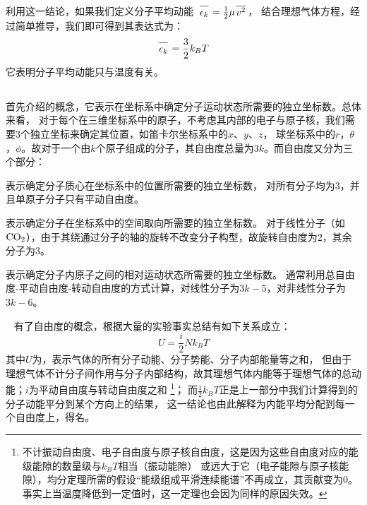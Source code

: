             利用这一结论，如果我们定义分子平均动能\ $\upperline{\epsilon_{k}} = \frac{1}{2} \mu \upperline{v^{2}}$，
            结合理想气体方程，经过简单推导，我们即可得到其表达式为：
            \begin{equation}
                \upperline{\epsilon_{k}} = \frac{3}{2}k_{B}T
                \nonumber
            \end{equation}
            它表明分子平均动能只与温度有关。
        \subsection[能量均分原理]{}
            首先介绍的概念，它表示在坐标系中确定分子运动状态所需要的独立坐标数。总体来看，
            对于每个在三维坐标系中的原子，不考虑其内部的电子与原子核，我们需要3个独立坐标来确定其位置，如笛卡尔坐标系中的$x$、$y$、$z$，
            球坐标系中的$r$，$\theta$，$\phi$。故对于一个由$k$个原子组成的分子，其自由度总量为$3k$。而自由度又分为三个部分：
            \begin{Itemize}
                \item {}表示确定分子质心在坐标系中的位置所需要的独立坐标数，
                对所有分子均为3，并且单原子分子只有平动自由度。
                \item {}表示确定分子在坐标系中的空间取向所需要的独立坐标数。
                对于线性分子（如$\rm{CO_{2}}$），由于其绕通过分子的轴的旋转不改变分子构型，故旋转自由度为2，其余分子为3。
                \item {}表示确定分子内原子之间的相对运动状态所需要的独立坐标数。
                通常利用总自由度-平动自由度-转动自由度的方式计算，对线性分子为$3k-5$，对非线性分子为$3k-6$。
            \end{Itemize}
            \ \newline 
            有了自由度的概念，根据大量的实验事实总结有如下关系成立：
            \begin{equation}
                U = \frac{i}{2}Nk_{B}T
                \nonumber
            \end{equation}
            其中$U$为，表示气体的所有分子动能、分子势能、分子内部能量等之和，
            但由于理想气体不计分子间作用与分子内部结构，故其理想气体内能等于理想气体的总动能；$i$为平动自由度与转动自由度之和
            \footnote{不计振动自由度、电子自由度与原子核自由度，这是因为这些自由度对应的能级能隙的数量级与$k_{B}T$相当（振动能隙）
            或远大于它（电子能隙与原子核能隙），均分定理所需的假设“能级组成平滑连续能谱”不再成立，其贡献变为0。
            事实上当温度降低到一定值时，这一定理也会因为同样的原因失效。}；
            而$\frac{1}{2}k_{B}T$正是上一部分中我们计算得到的分子动能平分到某个方向上的结果，
            这一结论也由此解释为内能平均分配到每一个自由度上，得名。

